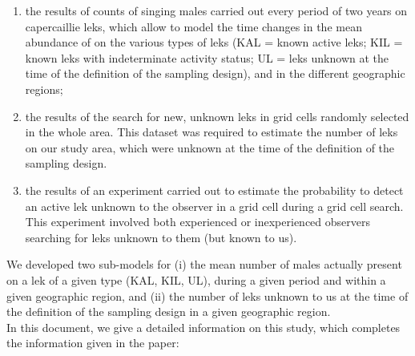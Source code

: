\documentclass[a4paper]{article}
\newenvironment{Default Paragraph Font}{}{}
\begin{document}
\begin{enumerate}
\item the results of counts of singing males carried out every period
  of two years on capercaillie leks, which allow to model the time
  changes in the mean abundance of on the various types of leks (KAL =
  known active leks; KIL = known leks with indeterminate activity
  status; UL = leks unknown at the time of the definition of the
  sampling design), and in the different geographic regions;\\

\item the results of the search for new, unknown leks in grid cells
  randomly selected in the whole area. This dataset was required to
  estimate the number of leks on our study area, which were unknown at
  the time of the definition of the sampling design.\\

\item the results of an experiment carried out to estimate the
  probability to detect an active lek unknown to the observer in a
  grid cell during a grid cell search. This experiment involved both
  experienced or inexperienced observers searching for leks unknown to
  them (but known to us).\\
\end{enumerate}

We developed two sub-models for (i) the mean number of males actually
present on a lek of a given type (KAL, KIL, UL), during a given period
and within a given geographic region, and (ii) the number of leks
unknown to us at the time of the definition of the sampling design in
a given geographic region.\\


In this document, we give a detailed information on this study, which
completes the information given in the paper:\\
\end{document}
